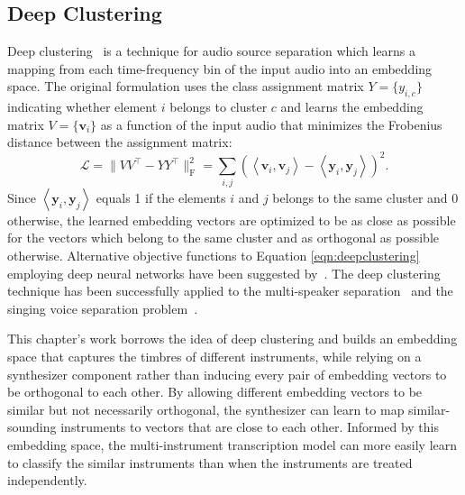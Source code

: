\subsection{Deep Clustering}

Deep clustering~\cite{hershey2016deepclustering} is a technique for audio source separation which learns a mapping from each time-frequency bin of the input audio into an embedding space.
The original formulation uses the class assignment matrix $Y = \{ y_{i,c} \}$ indicating whether element $i$ belongs to cluster $c$ and learns the embedding matrix $V = \{ \mathbf{v}_{i} \}$ as a function of the input audio that minimizes the Frobenius distance between the assignment matrix:
\begin{equation}\label{eqn:deepclustering}
\mathcal{L} = \lVert VV^\top - YY^\top \rVert_{\mathrm{F}}^2 = \sum_{i, j} \left ( \left < \mathbf{v}_i, \mathbf{v}_j \right > - \left < \mathbf{y}_i, \mathbf{y}_j \right > \right )^2.
\end{equation}
Since $\left < \mathbf{y}_i, \mathbf{y}_j \right >$ equals 1 if the elements $i$ and $j$ belongs to the same cluster and 0 otherwise, the learned embedding vectors are optimized to be as close as possible for the vectors which belong to the same cluster and as orthogonal as possible otherwise.
Alternative objective functions to Equation \ref{eqn:deepclustering} employing deep neural networks have been suggested by~\cite{wang2018deepclustering}.
The deep clustering technique has been successfully applied to the multi-speaker separation~\cite{isik2016deepclustering} and the singing voice separation problem~\cite{luo2017deepclustering}.

This chapter's work borrows the idea of deep clustering and builds an embedding space that captures the timbres of different instruments, while relying on a synthesizer component rather than inducing every pair of embedding vectors to be orthogonal to each other.
By allowing different embedding vectors to be similar but not necessarily orthogonal, the synthesizer can learn to map similar-sounding instruments to vectors that are close to each other.
Informed by this embedding space, the multi-instrument transcription model can more easily learn to classify the similar instruments than when the instruments are treated independently.


